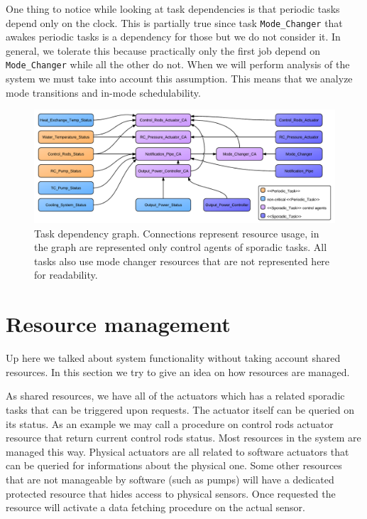 \documentclass[10pt,a4paper]{report}
\begin{document}
One thing to notice while looking at task dependencies is that periodic tasks 
depend only on the clock. This is partially true since task \texttt{Mode\_Changer} 
that awakes periodic tasks is a dependency for those but we do not consider it. 
In general, we tolerate this because practically only the first job depend on 
\texttt{Mode\_Changer} while all the other do not. When we will perform analysis 
of the system we must take into account this assumption. This means that we 
analyze mode transitions and in-mode schedulability.
\begin{figure}[htb]
\centering
\includegraphics[width=\textwidth]{diagrams/Dependacy_Graph}
\caption{
    Task dependency graph. Connections represent resource usage, in the graph 
    are represented only control agents of sporadic tasks. All tasks also 
    use mode changer resources that are not represented here for readability.
}
\label{depgraph}
\end{figure}

\section{Resource management}
Up here we talked about system functionality without taking account shared 
resources. In this section we try to give an idea on how resources are managed. 

As shared resources, we have all of the actuators which has a related sporadic 
tasks that can be triggered upon requests. The actuator itself can be queried on its status. 
As an example we may call a procedure on control rods actuator resource that 
return current control rods status. Most resources in the system are managed 
this way. Physical actuators are all related to software actuators that can be 
queried for informations about the physical one. Some other resources that are not 
manageable by software (such as pumps) will have a dedicated protected resource 
that hides access to physical sensors. Once requested the resource will activate 
a data fetching procedure on the actual sensor. 
\end{document}

